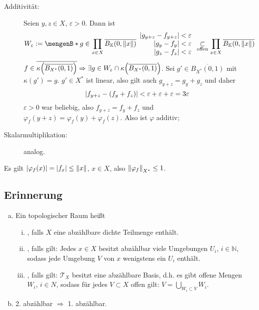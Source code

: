 \begin{description}
	\item[Additivität:] Seien $y,z \in X$, $\varepsilon>0$. Dann ist 
	\[
		W_\varepsilon := \set[g \in \prod_{x \in X} \overline{B_\mathds{K}(0, \norm{x} )} ]{\begin{array}{r}
			\abs*{g_{y+z}- f_{y+z}} < \varepsilon \\ \enspace\abs*{g_y-f_y} < \varepsilon \\ \enspace\abs*{g_z -f_z}  < \varepsilon
		\end{array}  }  
		\underset{\text{offen}}{\subset} \prod_{x \in X} \overline{B_\mathds{K}(0,\norm{x})} 
	\]
	$f \in \overline{\kappa \enbrace*{\overline{B_{X^*}(0,1)}}} \Rightarrow \exists g \in W_\varepsilon \cap \kappa \enbrace*{\overline{B_{X^*}(0,1)}}$. Sei 
	$g' \in \overline{B_{X^*}(0,1)}$ mit $\kappa(g')=g$. $g' \in X^*$ ist linear, also gilt auch $g_{y+z}= g_y + g_z$ und daher 
	\[
		\abs*{f_{y+z} - (f_y + f_z)} < \varepsilon + \varepsilon + \varepsilon= 3 \varepsilon
	\]
	$\varepsilon>0$ war beliebig, also $f_{y+z}= f_y+f_z$ und $\varphi_f(y+z)= \varphi_f(y)+ \varphi_f(z)$. Also ist $\varphi$ additiv;
	\item[Skalarmultiplikation:] analog.
\end{description}
Es gilt $\abs*{\varphi_f(x)} = \abs*{f_x} \le \norm{x}$, $x \in X$, also $\norm[X^*]{\varphi_f} \le 1$. \bewende

\subsection[Erinnerung: separabel, 1. abzählbar, 2. abzählbar]{Erinnerung} %
\label{sub:511}
\begin{enumerate}[(a)]
	\item Ein topologischer Raum heißt
	\begin{enumerate}[(i)]
		\item {}, falls $X$ eine abzählbare dichte Teilmenge enthält.
		\item {}, falls gilt: Jedes $x \in X$ besitzt abzählbar viele Umgebungen $U_i$, $i \in \mathds{N}$, sodass jede Umgebung $V$ von $x$ wenigstens ein
		$U_i$ enthält.  
		\item {}, falls gilt: $\mathcal{T}_X$ besitzt eine abzählbare Basis, d.h. es gibt offene Mengen $W_i$, $i \in N$, sodass für jedes $V \subset X$ 
		offen gilt: $V= \bigcup_{W_i \subset V} W_i$.
	\end{enumerate}
	\item 2. abzählbar $\Rightarrow $ 1. abzählbar.
\end{enumerate}



